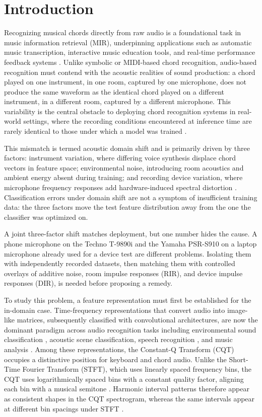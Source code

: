 \documentclass[pdflatex,sn-mathphys-num,iicol]{sn-jnl}
\theoremstyle{thmstyleone}
\theoremstyle{thmstyletwo}
\theoremstyle{thmstylethree}
\begin{document}
\section{Introduction}\label{sec1}

Recognizing musical chords directly from raw audio is a foundational task in music information retrieval (MIR), underpinning applications such as automatic music transcription, interactive music education tools, and real-time performance feedback systems \cite{Telila2023}\cite{Saputra2021}\cite{Moysis2023}. Unlike symbolic or MIDI-based chord recognition, audio-based recognition must contend with the acoustic realities of sound production: a chord played on one instrument, in one room, captured by one microphone, does not produce the same waveform as the identical chord played on a different instrument, in a different room, captured by a different microphone. This variability is the central obstacle to deploying chord recognition systems in real-world settings, where the recording conditions encountered at inference time are rarely identical to those under which a model was trained \cite{Kusaka2024}.

This mismatch is termed acoustic domain shift and is primarily driven by three factors: instrument variation, where differing voice synthesis displace chord vectors in feature space; environmental noise, introducing room acoustics and ambient energy absent during training; and recording device variation, where microphone frequency responses add hardware-induced spectral distortion \cite{Kusaka2024}\cite{Majchrzak2025}. Classification errors under domain shift are not a symptom of insufficient training data: the three factors move the test feature distribution away from the one the classifier was optimized on.

A joint three-factor shift matches deployment, but one number hides the cause. A phone microphone on the Techno T-9890i and the Yamaha PSR-S910 on a laptop microphone already used for a device test are different problems. Isolating them with independently recorded datasets, then matching them with controlled overlays of additive noise, room impulse responses (RIR), and device impulse responses (DIR), is needed before proposing a remedy.

To study this problem, a feature representation must first be established for the in-domain case. Time-frequency representations that convert audio into image-like matrices, subsequently classified with convolutional architectures, are now the dominant paradigm across audio recognition tasks including environmental sound classification \cite{Wolf-Monheim2025}, acoustic scene classification, speech recognition \cite{Zaman2023}, and music analysis \cite{Moysis2023}. Among these representations, the Constant-Q Transform (CQT) occupies a distinctive position for keyboard and chord audio. Unlike the Short-Time Fourier Transform (STFT), which uses linearly spaced frequency bins, the CQT uses logarithmically spaced bins with a constant quality factor, aligning each bin with a musical semitone \cite{Lacoste2007}. Harmonic interval patterns therefore appear as consistent shapes in the CQT spectrogram, whereas the same intervals appear at different bin spacings under STFT \cite{Li2021}.
\end{document}
